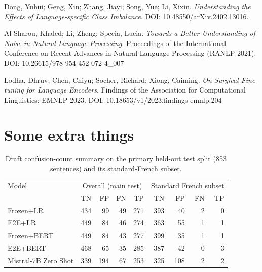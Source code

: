 \documentclass[12pt]{article}
\begin{document}
\begin{thebibliography}{9}
Dong, Yuhui; Geng, Xin; Zhang, Jiayi; Song, Yue; Li, Xixin.
\textit{Understanding the Effects of Language-specific Class Imbalance}.
DOI: 10.48550/arXiv.2402.13016.

Al Sharou, Khaled; Li, Zheng; Specia, Lucia.
\textit{Towards a Better Understanding of Noise in Natural Language Processing}.
Proceedings of the International Conference on Recent Advances in Natural Language Processing (RANLP 2021).
DOI: 10.26615/978-954-452-072-4\_007

Lodha, Dhruv; Chen, Chiyu; Socher, Richard; Xiong, Caiming.
\textit{On Surgical Fine-tuning for Language Encoders}.
Findings of the Association for Computational Linguistics: EMNLP 2023.
DOI: 10.18653/v1/2023.findings-emnlp.204


\end{thebibliography}


\appendix

\renewcommand{\thesection}{Appendix \Alph{section}}

\section{Some extra things}


\begin{table}[H]
    \centering
    \footnotesize
    \begin{tabular}{lrrrrrrrr}
        \hline
        Model & \multicolumn{4}{c}{Overall (main test)} & \multicolumn{4}{c}{Standard French subset} \\
         & TN & FP & FN & TP & TN & FP & FN & TP \\
        \hline
        Frozen+LR & 434 & 99 & 49 & 271 & 393 & 40 & 2 & 0 \\
        E2E+LR & 449 & 84 & 46 & 274 & 363 & 55 & 1 & 1 \\
        Frozen+BERT & 449 & 84 & 43 & 277 & 399 & 35 & 1 & 1 \\
        E2E+BERT & 468 & 65 & 35 & 285 & 387 & 42 & 0 & 3 \\
        Mistral-7B Zero Shot & 339 & 194 & 67 & 253 & 325 & 108 & 2 & 2 \\
        \hline
    \end{tabular}
    \caption{Draft confusion-count summary on the primary held-out test split (853 sentences) and its standard-French subset.}
    \label{tab:main-test-confusion-draft}
\end{table}
\end{document}
